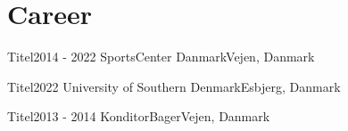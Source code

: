 \section{Career}
\mySubHeadingListStart

  \mySubHeading
  {Titel}{2014 - 2022}
  {SportsCenter Danmark}{Vejen, Danmark}
    \myItemListStart
    \myItemListEnd

  \mySubHeading
  {Titel}{2022}
  {University of Southern Denmark}{Esbjerg, Danmark}
    \myItemListStart
    \myItemListEnd

  \mySubHeading
  {Titel}{2013 - 2014}
  {KonditorBager}{Vejen, Danmark}
    \myItemListStart
    \myItemListEnd

\mySubHeadingListEnd
